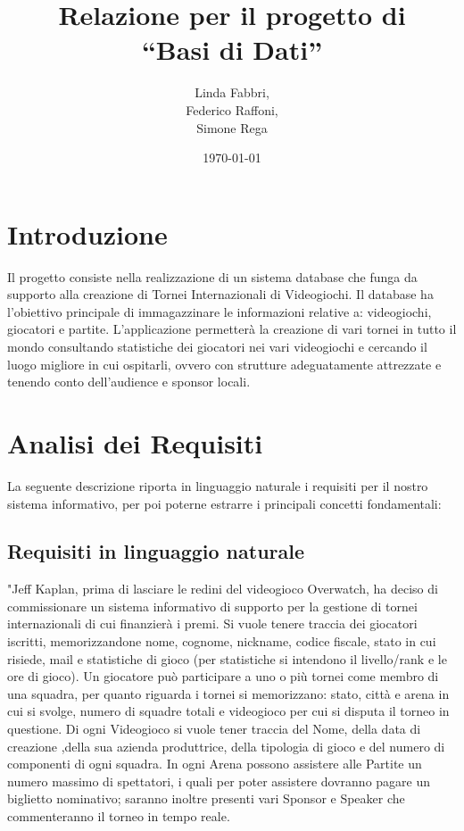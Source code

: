 \documentclass[a4paper,12pt]{report}
\title{Relazione per il progetto di\\``Basi di Dati''}
\author{Linda Fabbri,\\Federico Raffoni,\\Simone Rega}
\date{\today}
\begin{document}
\maketitle

\tableofcontents

\chapter{Introduzione}

Il progetto consiste nella realizzazione di un sistema database che funga da supporto alla creazione di Tornei Internazionali di Videogiochi.
Il database ha l'obiettivo principale di immagazzinare le informazioni relative a: videogiochi, giocatori e partite. 
L'applicazione permetterà la creazione di vari tornei in tutto il mondo consultando statistiche dei giocatori nei vari videogiochi e cercando il luogo migliore in cui ospitarli, ovvero con strutture adeguatamente attrezzate e tenendo conto dell'audience e sponsor locali.


\chapter{Analisi dei Requisiti}
La seguente descrizione riporta in linguaggio naturale i requisiti per il nostro sistema informativo, per poi poterne estrarre i principali concetti fondamentali:
\section{Requisiti in linguaggio naturale}
"Jeff Kaplan, prima di lasciare le redini del videogioco Overwatch, ha deciso di commissionare un sistema informativo di supporto per la gestione di tornei internazionali di cui finanzierà i premi.
Si vuole tenere traccia dei giocatori iscritti, memorizzandone nome, cognome, nickname, codice fiscale, stato in cui risiede, mail e statistiche di gioco (per statistiche si intendono il livello/rank e le ore di gioco).
Un giocatore può participare a uno o più tornei come membro di una squadra, per quanto riguarda i tornei si memorizzano: stato, città e arena in cui si svolge, numero di squadre totali e videogioco per cui si disputa il torneo in questione.
Di ogni Videogioco si vuole tener traccia del Nome, della data di creazione ,della sua azienda produttrice, della tipologia di gioco e del numero di componenti di ogni squadra.
In ogni Arena possono assistere alle Partite un numero massimo di spettatori, i quali per poter assistere dovranno pagare un biglietto nominativo; saranno inoltre presenti vari Sponsor e Speaker che commenteranno il torneo in tempo reale.
\end{document}
